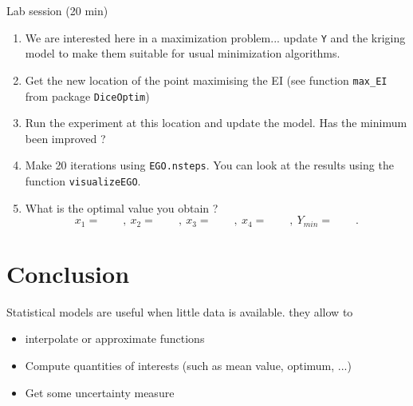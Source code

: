 \documentclass{beamer}
\begin{document}
\begin{frame}{}
\begin{exampleblock}{Lab session (20 min)}
	\begin{enumerate}
		\item We are interested here in a maximization problem... update \texttt{Y} and the kriging model to make them suitable for usual minimization algorithms. 
    \item Get the new location of the point maximising the EI (see function \texttt{max\_EI} from package \texttt{DiceOptim})
		\item Run the experiment at this location and update the model. Has the minimum been improved ?
		\item Make 20 iterations using \texttt{EGO.nsteps}. You can look at the results using the function \texttt{visualizeEGO}.
		\item What is the optimal value you obtain ?
		$$ x_1 = \qquad,\ x_2 = \qquad,\ x_3 = \qquad,\ x_4 = \qquad,\ Y_{min} = \qquad.$$
	\end{enumerate}
\end{exampleblock}
\end{frame}






\section{Conclusion}

\begin{frame}{}
Statistical models are useful when little data is available. they allow to
  \begin{itemize}
    \item interpolate or approximate functions
    \item Compute quantities of interests (such as mean value, optimum, ...)
    \item Get some uncertainty measure
  \end{itemize}
\end{frame}
\end{document}
